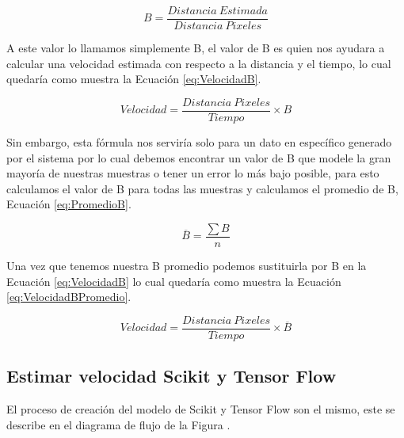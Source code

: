 \begin{equation}
    \label{eq:EcuacionB}
    B = \frac{Distancia \: Estimada}{Distancia \: Pixeles}
\end{equation}

A este valor lo llamamos simplemente B, el valor de B es quien nos ayudara a calcular una velocidad estimada con respecto a la distancia y el tiempo, lo cual quedaría como muestra la Ecuación \ref{eq:VelocidadB}.

\begin{equation}
    \label{eq:VelocidadB}
    Velocidad = \frac{Distancia \: Pixeles}{Tiempo} \times B
\end{equation}

Sin embargo, esta fórmula nos serviría solo para un dato en específico generado por el sistema por lo cual debemos encontrar un valor de B que modele la gran mayoría de nuestras muestras o tener un error lo más bajo posible, para esto calculamos el valor de B para todas las muestras y calculamos el promedio de B, Ecuación \ref{eq:PromedioB}.

\begin{equation}
    \label{eq:PromedioB}
    \overline{B} = \frac{\sum B}{n}
\end{equation}

Una vez que tenemos nuestra B promedio podemos sustituirla por B en la Ecuación \ref{eq:VelocidadB} lo cual quedaría como muestra la Ecuación \ref{eq:VelocidadBPromedio}.

\begin{equation}
    \label{eq:VelocidadBPromedio}
    Velocidad = \frac{Distancia \: Pixeles}{Tiempo} \times \overline{B}
\end{equation}



\subsection{Estimar velocidad Scikit y Tensor Flow}

El proceso de creación del modelo de Scikit y Tensor Flow son el mismo, este se describe en el diagrama de flujo de la Figura \label{ref:ModeloScikitTensorFlow}.

